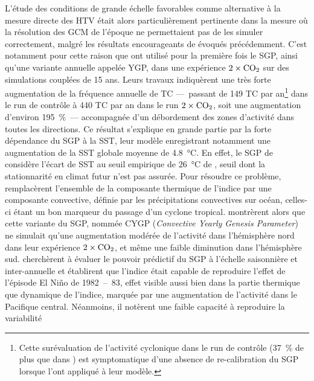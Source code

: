 \documentclass[../main.tex]{subfiles}
\begin{document}
L'étude des conditions de grande échelle favorables comme alternative à la mesure directe des HTV était alors particulièrement pertinente dans la mesure où la
résolution des GCM de l'époque ne permettaient pas de les simuler correctement, malgré les résultats encourageants de \textcite{broccoli_can_1990} évoqués
précédemment. C'est notamment pour cette raison que \hbox{\textcite{ryan_tropical_1992}} ont utilisé pour la première fois le SGP, ainsi qu'une variante annuelle
appelée YGP, dans une expérience \ensuremath{2\times\ce{CO2}} sur des simulations couplées de \num{15} ans. Leurs travaux indiquèrent une très forte
augmentation de la fréquence annuelle de TC ---~passant de \num{149} TC par an\footnote{Cette surévaluation de l'activité cyclonique dans le run de contrôle
(\SI{37}{\percent} de plus que dans \cite{gray_tropical_1975}) est symptomatique d'une absence de re-calibration du SGP lorsque \textcite{ryan_tropical_1992}
l'ont appliqué à leur modèle.} dans le run de contrôle à \num{440} TC par an dans le run \ensuremath{2\times\ce{CO2}}, soit une augmentation d'environ
\SI{195}{\percent}~--- accompagnée d'un débordement des zones d'activité dans toutes les directions. Ce résultat s'explique en grande partie par la forte
dépendance du SGP à la SST, leur modèle enregistrant notamment une augmentation de la SST globale moyenne de \SI{4.8}{\degreeCelsius}. En effet, le SGP de
\citeauthor{gray_tropical_1975} considère l'écart de SST au seuil empirique de \SI{26}{\degreeCelsius} de \textcite{palmen_formation_1948}, seuil dont la
stationnarité en climat futur n'est pas assurée. Pour résoudre ce problème, \textcite{royer_gcm_1998} remplacèrent l'ensemble de la composante thermique de
l'indice par une composante convective, définie par les précipitations convectives sur océan, celles-ci étant un bon marqueur du passage d'un cyclone tropical.
\textcite{royer_gcm_1998} montrèrent alors que cette variante du SGP, nommée CYGP (\textit{Convective Yearly Genesis Parameter}) ne simulait qu'une augmentation
modérée de l'activité dans l'hémisphère nord dans leur expérience \ensuremath{2\times\ce{CO2}}, et même une faible diminution dans l'hémisphère sud.
\mbox{\textcite{watterson_seasonal_1995}} cherchèrent à évaluer le pouvoir prédictif du SGP à l'échelle saisonnière et inter-annuelle et établirent que l'indice
était capable de reproduire l'effet de l'épisode El Niño de \num{1982}~--~\num{83}, effet visible  aussi bien dans la partie thermique que dynamique de
l'indice, marquée par une augmentation de l'activité dans le Pacifique central. Néanmoins, il notèrent une faible capacité à reproduire la variabilité
\end{document}
